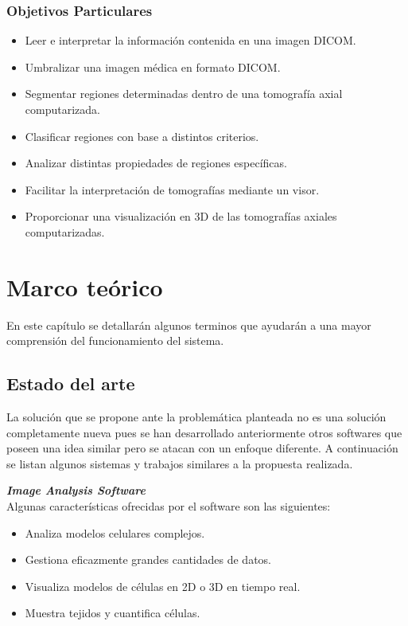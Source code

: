 \documentclass[12pt]{report}
\begin{document}
\subsection{Objetivos Particulares}
\begin{itemize}
\item Leer e interpretar la información contenida en una imagen DICOM.
\item Umbralizar una imagen médica en formato DICOM.
\item Segmentar regiones determinadas dentro de una tomografía axial computarizada.
\item Clasificar regiones con base a distintos criterios.
\item Analizar distintas propiedades de regiones específicas.
\item Facilitar la interpretación de tomografías mediante un visor.
\item Proporcionar una visualización en 3D de las tomografías axiales computarizadas.
\end{itemize}


\chapter{Marco teórico}
En este capítulo se detallarán algunos terminos que ayudarán a una mayor comprensión del funcionamiento del sistema.
\section{Estado del arte}
La solución que se propone ante la problemática planteada no es una solución completamente nueva pues se han desarrollado anteriormente otros softwares que poseen una idea similar pero se atacan con un enfoque diferente. A continuación se listan algunos sistemas y trabajos similares a la propuesta realizada.

\hfill\break
\textbf{\textit{Image Analysis Software}}\cite{ims}
\\Algunas características ofrecidas por el software son las siguientes:
\begin{itemize}
\item Analiza modelos celulares complejos.
\item Gestiona eficazmente grandes cantidades de datos.
\item Visualiza modelos de células en 2D o 3D en tiempo real.
\item Muestra tejidos y cuantifica células.
\end{itemize}
\end{document}
